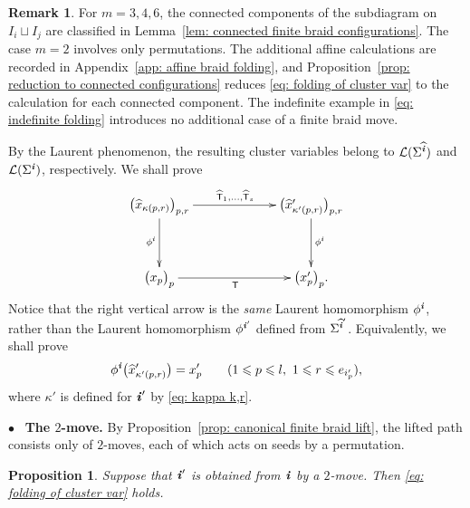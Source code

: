 \documentclass[12pt, leqno]{amsart}
\numberwithin{equation}{section}
\theoremstyle{plain}
\newtheorem{proposition}[lemma]{Proposition}
\theoremstyle{definition}
\newtheorem{remark}[lemma]{Remark}
\renewcommand{\le}{\leqslant}
\newcommand{\ii}{ \textbf{\textit{i}}}
\newcommand{\hx}{\widehat{x}}
\newcommand{\hii}{{\widehat{\ii}}}
\newcommand{\sfT}{\mathsf{T}}
\newcommand{\hsfT}{\widehat{\sfT}}
\newcommand{\calL}{\mathcal{L}}
\begin{document}
\begin{remark}\label{rem: larger fibers braid}
 For $m=3,4,6$, the connected components of the subdiagram on $I_i\sqcup I_j$
are classified in Lemma~\ref{lem: connected finite braid configurations}.
The case $m=2$ involves only permutations.
The additional affine calculations are recorded in
Appendix~\ref{app: affine braid folding}, and
Proposition~\ref{prop: reduction to connected configurations}
reduces \eqref{eq: folding of cluster var} to the calculation for each connected component.
The indefinite example in \eqref{eq: indefinite folding} introduces
no additional case of a finite braid move.
\end{remark}

\noindent
{}
 By the Laurent phenomenon, the resulting cluster variables belong
to $\calL(\Sigma^\hii)$ and $\calL(\Sigma^\ii)$, respectively.  We shall prove
\[
\xymatrix@C=65pt@R=38pt{
\bigl(\hx_{\kappa(p,r)}\bigr)_{p,r} \ar[r]^{\hsfT_1,\ldots,\hsfT_s}  \ar[d]_{\phi^\ii}
& \bigl(\hx'_{\kappa'(p,r)}\bigr)_{p,r}  \ar[d]^{\phi^\ii}
\\
\bigl(x_p\bigr)_p \ar[r]_{\sfT} & \bigl(x'_p\bigr)_p .
}
\]
Notice that the right vertical arrow is  the \emph{same} Laurent homomorphism $\phi^\ii$, rather than
the Laurent homomorphism $\phi^{\ii'}$ defined from $\Sigma^{\hii'}$. Equivalently, we shall prove
\begin{align} \label{eq: folding of cluster var}
\phi^\ii\bigl(\hx'_{\kappa'(p,r)}\bigr)=x'_p \qquad  (1\le p\le l,\ 1\le r\le e_{i'_p}),
\end{align}
 where $\kappa'$ is defined for $\ii'$ by
\eqref{eq: kappa k,r}.

\medskip
\noindent
$\bullet$ \ \textbf{The $2$-move.}
 By Proposition~\ref{prop: canonical finite braid lift}, the lifted path consists only of $2$-moves, each of which acts on seeds by a permutation.

\begin{proposition}\label{prop: cluster variable folding 2 move}
Suppose that $\ii'$ is obtained from $\ii$ by a $2$-move.
Then \eqref{eq: folding of cluster var} holds.
\end{proposition}
\end{document}
